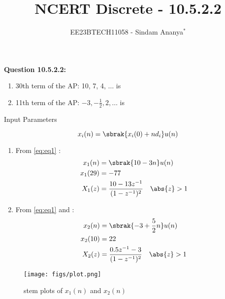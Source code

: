 \documentclass[journal,12pt,twocolumn]{IEEEtran}
\theoremstyle{remark}
\begin{document}

\vspace{3cm}

\title{NCERT Discrete - 10.5.2.2}
\author{EE23BTECH11058 - Sindam Ananya$^{*}$%
}
\maketitle
\newpage
\bigskip

\renewcommand{\thefigure}{\theenumi}
\renewcommand{\thetable}{\theenumi}

\vspace{3cm}
\textbf{Question 10.5.2.2:} 
\begin{enumerate}
\item 30th term of the AP: 10, 7, 4, $\ldots$ is 
\item 11th term of the AP: $-3, -\frac{1}{2}, 2, \ldots$ is
\end{enumerate}
\solution
\fi
\begin{table}[h!]
    \centering
    
    \caption{Input Parameters}
    \label{tab:table1}
    \end{table}
\begin{equation}
    x_i(n) = \sbrak{x_i(0) + nd_i} u(n)
    \label{eq:eq1}
\end{equation}
\begin{enumerate}
\item From \eqref{eq:eq1}  :
\begin{align}
x_1(n) &= \sbrak{10 -3n}u(n)\\
x_1(29) &= -77\\
X_1(z) &= \frac{10 - 13z^{-1}}{(1-z^{-1})^2} \quad \abs{z} > 1
\end{align}
\item From \eqref{eq:eq1} and  :
\begin{align}
x_2(n) &= \sbrak{-3 + \frac{5}{2}n}u(n)\\
x_2(10) &= 22\\
X_2(z) &= \frac{0.5z^{-1}-3}{(1-z^{-1})^2} \quad \abs{z}> 1
\end{align}
\end{enumerate}
\begin{figure}[h!]
    \centering
    \texttt{[image: figs/plot.png]}
    \caption{stem plots of $x_1(n)$ and $x_2(n)$}
    \label{fig:1}
\end{figure}
\end{document}
